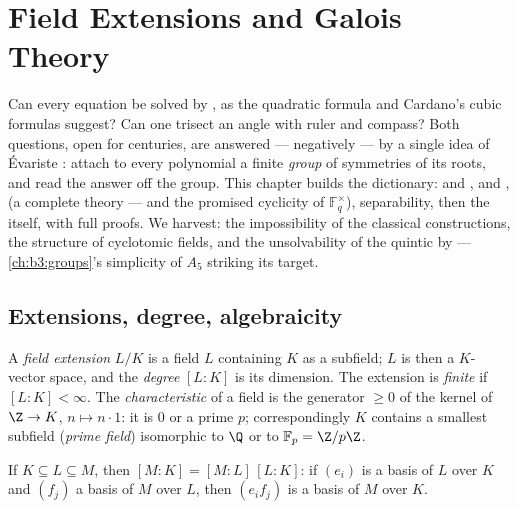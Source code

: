 \chapter{Field Extensions and Galois Theory}\label{ch:b3:galois}

Can every equation be solved by , as the quadratic formula
and Cardano's cubic formulas suggest? Can one trisect an angle
with ruler and compass? Both questions, open for centuries, are
answered --- negatively --- by a single idea of \'Evariste :
attach to every polynomial a finite \emph{group} of symmetries of
its roots, and read the answer off the group. This chapter builds
the dictionary:  and ,  and
,  (a complete theory --- and the
promised cyclicity of $\mathbb F_q^\times$), separability, then
the  itself, with full proofs. We harvest:
the impossibility of the classical constructions, the structure of
cyclotomic fields, and the unsolvability of the quintic by
 --- \cref{ch:b3:groups}'s simplicity of $A_5$ striking
its target.

\section{Extensions, degree, algebraicity}

\begin{definition}\label{def:b3:galois:extension}
A \emph{field extension} $L/K$ is a field
$L$ containing $K$ as a subfield; $L$ is then a $K$-vector space,
and the \emph{degree} $[L:K]$ is
its dimension. The extension is \emph{finite} if $[L:K] <
\infty$. The \emph{characteristic} of a field is the generator
$\geq 0$ of the kernel of $\Z \to K$, $n \mapsto n\cdot 1$: it is
$0$ or a prime $p$; correspondingly $K$ contains a smallest
subfield (\emph{prime field}) isomorphic to $\Q$ or to $\mathbb
F_p = \Z/p\Z$.
\end{definition}

\begin{theorem}\label{thm:b3:galois:tower}
If $K \subseteq L \subseteq M$, then $[M:K] = [M:L]\,[L:K]$: if
$(e_i)$ is a basis of $L$ over $K$ and $(f_j)$ a basis of $M$
over $L$, then $(e_if_j)$ is a basis of $M$ over
$K$.
\end{theorem}


